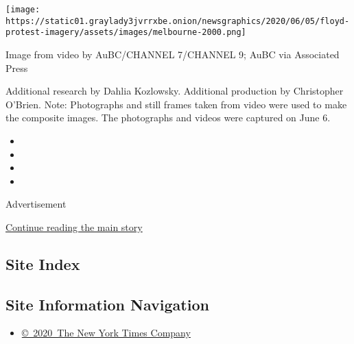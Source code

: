 \texttt{[image: https://static01.graylady3jvrrxbe.onion/newsgraphics/2020/06/05/floyd-protest-imagery/assets/images/melbourne-2000.png]}

Image from video by AuBC/CHANNEL 7/CHANNEL 9; AuBC via Associated Press

Additional research by Dahlia Kozlowsky. Additional production by
Christopher O'Brien. \textbar{} Note: Photographs and still frames taken
from video were used to make the composite images. The photographs and
videos were captured on June 6.

\begin{itemize}
\item
\item
\item
\item
\end{itemize}

Advertisement

\protect\hyperlink{after-bottom}{Continue reading the main story}

\hypertarget{site-index}{%
\subsection{Site Index}\label{site-index}}

\hypertarget{site-information-navigation}{%
\subsection{Site Information
Navigation}\label{site-information-navigation}}

\begin{itemize}
\tightlist
\item
  \href{https://help.nytimes3xbfgragh.onion/hc/en-us/articles/115014792127-Copyright-notice}{©~2020~The
  New York Times Company}
\end{itemize}

